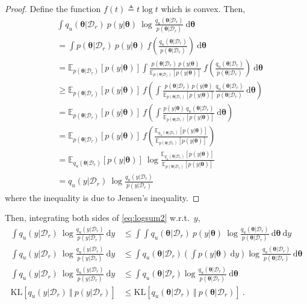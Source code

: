\documentclass{article}
\theoremstyle{definition}
\newcommand{\mcl}[1]{\mathcal{#1}}
\newcommand{\mbb}[1]{\mathbb{#1}}
\newcommand{\dc}{\mcl{D}_r}
\begin{document}
\begin{proof}
Define the function $f(t) \triangleq t\log t$ which is convex. Then, 
%
\begin{align*}
&\int q_u(\bm{\theta}|\dc)\  p(y|\bm{\theta})\ \log \frac{q_u(\bm{\theta}|\dc)}{p(\bm{\theta}|\dc)}\ \text{d}\bm{\theta}\\
&=\int p(\bm{\theta}|\dc) \ p(y|\bm{\theta})\  f\left(\frac{q_u(\bm{\theta}|\dc)}{p(\bm{\theta}|\dc)}\right)\ \text{d}\bm{\theta}\\
&=\mbb{E}_{p(\bm{\theta}|\dc)}[p(y|\bm{\theta})] 
    \int 
    \frac{p(\bm{\theta}|\dc) \ p(y|\bm{\theta})}{\mbb{E}_{p(\bm{\theta}|\dc)}[p(y|\bm{\theta})]}\ 
    f\left(\frac{q_u(\bm{\theta}|\dc)}{p(\bm{\theta}|\dc)}\right)\ \text{d}\bm{\theta}\\
&\ge \mbb{E}_{p(\bm{\theta}|\dc)}[p(y|\bm{\theta})] 
    \ f\left(
        \int 
        \frac{p(\bm{\theta}|\dc) \ p(y|\bm{\theta})}{\mbb{E}_{p(\bm{\theta}|\dc)}[p(y|\bm{\theta})]}
        \frac{q_u(\bm{\theta}|\dc)}{p(\bm{\theta}|\dc)}\ \text{d}\bm{\theta}
    \right)\\
&= \mbb{E}_{p(\bm{\theta}|\dc)}[p(y|\bm{\theta})] 
\ f\left(
        \int 
        \frac{p(y|\bm{\theta})\ q_u(\bm{\theta}|\dc)}{\mbb{E}_{p(\bm{\theta}|\dc)}[p(y|\bm{\theta})]}\ \text{d}\bm{\theta}
    \right)\\
&= \mbb{E}_{p(\bm{\theta}|\dc)}[p(y|\bm{\theta})] 
    \ f\left(
        \frac{ \mbb{E}_{q_u(\bm{\theta}|\dc)}[p(y|\bm{\theta})]}{\mbb{E}_{p(\bm{\theta}|\dc)}[p(y|\bm{\theta})]}
    \right)\\
&= \mbb{E}_{q_u(\bm{\theta}|\dc)}[p(y|\bm{\theta})]\ \log \frac{\mbb{E}_{q_u(\bm{\theta}|\dc)}[p(y|\bm{\theta})]}{\mbb{E}_{p(\bm{\theta}|\dc)}[p(y|\bm{\theta})]}\\
&= q_u(y|\dc)\ \log \frac{q_u(y|\dc)}{p(y|\dc)}
\end{align*}
where the inequality is due to Jensen's inequality.
\end{proof}

Then, integrating both sides of \eqref{eq:logsum2} w.r.t.~$y$, 
%
\begin{align*}
\int q_u(y|\dc)\ \log \frac{q_u(y|\dc)}{p(y|\dc)}\ \text{d}y
&\le 
\int \int q_u(\bm{\theta}|\dc) \ p(y|\bm{\theta})\ \log \frac{q_u(\bm{\theta}|\dc)}{p(\bm{\theta}|\dc)}\ \text{d}\bm{\theta}\ \text{d}y\\
\int q_u(y|\dc)\ \log \frac{q_u(y|\dc)}{p(y|\dc)}\ \text{d}y
&\le 
\int q_u(\bm{\theta}|\dc) \left(\int p(y|\bm{\theta})\ \text{d}y \right) \log \frac{q_u(\bm{\theta}|\dc)}{p(\bm{\theta}|\dc)}\ \text{d}\bm{\theta}\\
\int q_u(y|\dc)\ \log \frac{q_u(y|\dc)}{p(y|\dc)}\ \text{d}y
&\le 
\int q_u(\bm{\theta}|\dc) \log \frac{q_u(\bm{\theta}|\dc)}{p(\bm{\theta}|\dc)}\ \text{d}\bm{\theta}\\
\text{KL}[q_u(y|\dc)\ \Vert\ p(y|\dc)] &\le \text{KL}[q_u(\bm{\theta}|\dc)\ \Vert\ p(\bm{\theta}|\dc)]\ .
\end{align*}
\end{document}
